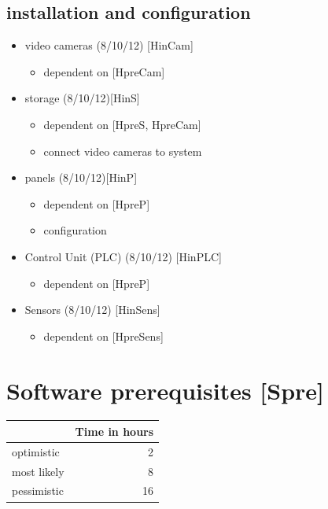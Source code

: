 \documentclass
[
 12pt, %
       DIV12,
       a4paper, %
       oneside, %
       titlepage, %
       parskip=half, %
       headings=normal, %
       listof=totoc, %
       bibliography=totoc, %
       index=totoc, %
       captions=tableheading, %
       ]{scrreprt}
\begin{document}
\section{installation and configuration}
\label{sec:org7c12187}
\begin{itemize}
\item video cameras (8/10/12) [HinCam] 
	\begin{itemize}
	\item dependent on [HpreCam]
	\end{itemize}
\item storage  (8/10/12)[HinS]
	\begin{itemize}
	\item dependent on [HpreS, HpreCam]
	\item connect video cameras to system
	\end{itemize}
\item panels (8/10/12)[HinP]
	\begin{itemize}
	\item dependent on [HpreP]
	\item configuration
	\end{itemize}
\item Control Unit (PLC) (8/10/12) [HinPLC]
	\begin{itemize}
	\item dependent on [HpreP]
	\end{itemize}
\item Sensors (8/10/12) [HinSens]
	\begin{itemize}
	\item dependent on [HpreSens]
	\end{itemize}
\end{itemize}

\chapter{Software prerequisites [Spre]}
\label{sec:org180caa5}

\begin{center}
\begin{tabular}{|l|r|}
	\hline
	& Time in hours\\
	\hline
	optimistic & 2\\
	\hline
	most likely & 8\\
	\hline
	pessimistic & 16\\
	\hline
\end{tabular}
\end{center}
\end{document}
